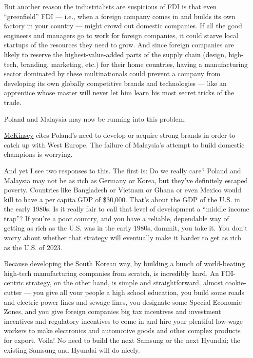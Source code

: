 \documentclass[
]{book}
\begin{document}
But another reason the industrialists are suspicious of FDI is that even ``greenfield'' FDI --- i.e., when a foreign company comes in and builds its own factory in your country --- might crowd out domestic companies. If all the good engineers and managers go to work for foreign companies, it could starve local startups of the resources they need to grow. And since foreign companies are likely to reserve the highest-value-added parts of the supply chain (design, high-tech, branding, marketing, etc.) for their home countries, having a manufacturing sector dominated by these multinationals could prevent a company from developing its own globally competitive brands and technologies --- like an apprentice whose master will never let him learn his most secret tricks of the trade.

Poland and Malaysia may now be running into this problem.

\href{https://www.mckinsey.com/~/media/mckinsey/business\%20functions/economic\%20studies\%20temp/our\%20insights/how\%20poland\%20can\%20become\%20a\%20european\%20growth\%20engine/poland\%202025_full_report.ashx}{McKinsey} cites Poland's need to develop or acquire strong brands in order to catch up with West Europe. The failure of Malaysia's attempt to build domestic champions is worrying.

And yet I see two responses to this. The first is: Do we really care? Poland and Malaysia may not be as rich as Germany or Korea, but they've definitely escaped poverty. Countries like Bangladesh or Vietnam or Ghana or even Mexico would kill to have a per capita GDP of \$30,000. That's about the GDP of the U.S. in the early 1980s. Is it really fair to call that level of development a ``middle income trap''? If you're a poor country, and you have a reliable, dependable way of getting as rich as the U.S. was in the early 1980s, dammit, you take it. You don't worry about whether that strategy will eventually make it harder to get as rich as the U.S. of 2023.

Because developing the South Korean way, by building a bunch of world-beating high-tech manufacturing companies from scratch, is incredibly hard. An FDI-centric strategy, on the other hand, is simple and straightforward, almost cookie-cutter --- you give all your people a high school education, you build some roads and electric power lines and sewage lines, you designate some Special Economic Zones, and you give foreign companies big tax incentives and investment incentives and regulatory incentives to come in and hire your plentiful low-wage workers to make electronics and automotive goods and other complex products for export. Voila! No need to build the next Samsung or the next Hyundai; the existing Samsung and Hyundai will do nicely.
\end{document}
